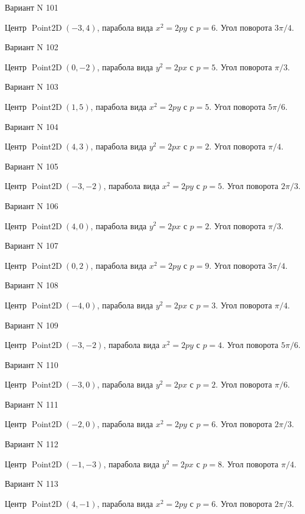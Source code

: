 \documentclass[11pt]{report}
\begin{document}
Вариант N 101

Центр $\operatorname{Point2D}\left(-3, 4\right)$, парабола вида $x^{2} = 2py$ с $p = 6$. Угол поворота $3 \pi / 4$.

Вариант N 102

Центр $\operatorname{Point2D}\left(0, -2\right)$, парабола вида $y^{2} = 2px$ с $p = 5$. Угол поворота $\pi / 3$.

Вариант N 103

Центр $\operatorname{Point2D}\left(1, 5\right)$, парабола вида $x^{2} = 2py$ с $p = 5$. Угол поворота $5 \pi / 6$.

Вариант N 104

Центр $\operatorname{Point2D}\left(4, 3\right)$, парабола вида $y^{2} = 2px$ с $p = 2$. Угол поворота $\pi / 4$.

Вариант N 105

Центр $\operatorname{Point2D}\left(-3, -2\right)$, парабола вида $x^{2} = 2py$ с $p = 5$. Угол поворота $2 \pi / 3$.

Вариант N 106

Центр $\operatorname{Point2D}\left(4, 0\right)$, парабола вида $y^{2} = 2px$ с $p = 2$. Угол поворота $\pi / 3$.

Вариант N 107

Центр $\operatorname{Point2D}\left(0, 2\right)$, парабола вида $x^{2} = 2py$ с $p = 9$. Угол поворота $3 \pi / 4$.

Вариант N 108

Центр $\operatorname{Point2D}\left(-4, 0\right)$, парабола вида $y^{2} = 2px$ с $p = 3$. Угол поворота $\pi / 4$.

Вариант N 109

Центр $\operatorname{Point2D}\left(-3, -2\right)$, парабола вида $x^{2} = 2py$ с $p = 4$. Угол поворота $5 \pi / 6$.

Вариант N 110

Центр $\operatorname{Point2D}\left(-3, 0\right)$, парабола вида $y^{2} = 2px$ с $p = 2$. Угол поворота $\pi / 6$.

Вариант N 111

Центр $\operatorname{Point2D}\left(-2, 0\right)$, парабола вида $x^{2} = 2py$ с $p = 6$. Угол поворота $2 \pi / 3$.

Вариант N 112

Центр $\operatorname{Point2D}\left(-1, -3\right)$, парабола вида $y^{2} = 2px$ с $p = 8$. Угол поворота $\pi / 4$.

Вариант N 113

Центр $\operatorname{Point2D}\left(4, -1\right)$, парабола вида $x^{2} = 2py$ с $p = 6$. Угол поворота $2 \pi / 3$.
\end{document}
